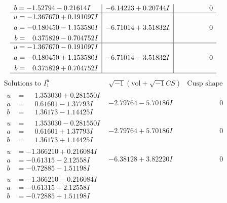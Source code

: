 \documentclass[1p]{elsarticle_modified}
\theoremstyle{definition}
\newcommand{\I}{\sqrt{-1}}
\begin{document}
$$\begin{array}{c|c|c}
\begin{aligned}
b &= -1.52794 - 0.21614 I\end{aligned}
 & -6.14223 + 0.20744 I & \phantom{-0.000000 } 0 \\ \hline\begin{aligned}
u &= -1.367670 + 0.191097 I \\
a &= -0.180450 - 1.153580 I \\
b &= \phantom{-}0.375829 - 0.704752 I\end{aligned}
 & -6.71014 + 3.51832 I & \phantom{-0.000000 } 0 \\ \hline\begin{aligned}
u &= -1.367670 - 0.191097 I \\
a &= -0.180450 + 1.153580 I \\
b &= \phantom{-}0.375829 + 0.704752 I\end{aligned}
 & -6.71014 - 3.51832 I & \phantom{-0.000000 } 0\\
 \hline 
 \end{array}$$\newpage$$\begin{array}{c|c|c}  
\text{Solutions to }I^u_{1}& \I (\text{vol} + \sqrt{-1}CS) & \text{Cusp shape}\\
 \hline 
\begin{aligned}
u &= \phantom{-}1.353030 + 0.281550 I \\
a &= \phantom{-}0.61601 - 1.37793 I \\
b &= \phantom{-}1.36173 - 1.14425 I\end{aligned}
 & -2.79764 - 5.70186 I & \phantom{-0.000000 } 0 \\ \hline\begin{aligned}
u &= \phantom{-}1.353030 - 0.281550 I \\
a &= \phantom{-}0.61601 + 1.37793 I \\
b &= \phantom{-}1.36173 + 1.14425 I\end{aligned}
 & -2.79764 + 5.70186 I & \phantom{-0.000000 } 0 \\ \hline\begin{aligned}
u &= -1.366210 + 0.216084 I \\
a &= -0.61315 - 2.12558 I \\
b &= -0.72885 - 1.51198 I\end{aligned}
 & -6.38128 + 3.82220 I & \phantom{-0.000000 } 0 \\ \hline\begin{aligned}
u &= -1.366210 - 0.216084 I \\
a &= -0.61315 + 2.12558 I \\
b &= -0.72885 + 1.51198 I\end{aligned}

\end{array}$$
\end{document}
